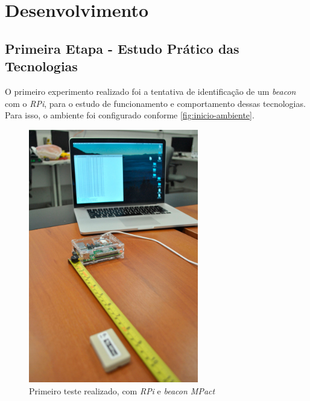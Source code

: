 \chapter{Desenvolvimento}\label{cap:desenvolvimento}

\section{Primeira Etapa - Estudo Prático das Tecnologias}\label{sec:primeira-etapa}

O primeiro experimento realizado foi a tentativa de identificação de um \textit{beacon} com o \textit{RPi}, para o estudo de funcionamento e comportamento dessas tecnologias. Para isso, o ambiente foi configurado conforme \autoref{fig:inicio-ambiente}. 

\begin{figure}[htb]
	\caption{\label{fig:inicio-ambiente}Primeiro teste realizado, com \textit{RPi} e \textit{beacon MPact}}
	\begin{center}
		\includegraphics[width=0.66\textwidth]{img/ambiente1.jpg}
	\end{center}
\end{figure}

